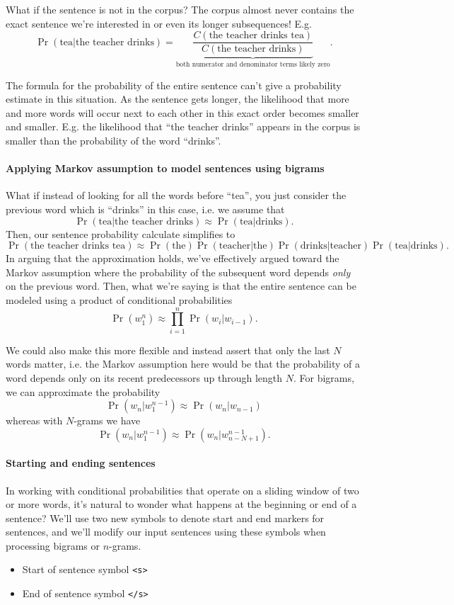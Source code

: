 \documentclass[12pt]{article}
\begin{document}
What if the sentence is not in the corpus? The corpus almost never contains the exact sentence we're interested in or even its longer subsequences! E.g.
\[
  \Pr(\textrm{tea} | \textrm{the teacher drinks}) = \underbrace{\frac{C(\textrm{the teacher drinks tea})}{C(\textrm{the teacher drinks})}}_{\textrm{both numerator and denominator terms likely zero}}.
\]

The formula for the probability of the entire sentence can't give a probability estimate in this situation. As the sentence gets longer, the likelihood that more and more words will occur next to each other in this exact order becomes smaller and smaller. E.g. the likelihood that ``the teacher drinks'' appears in the corpus is smaller than the probability of the word ``drinks''.

\paragraph{Applying Markov assumption to model sentences using bigrams} What if instead of looking for all the words before ``tea'', you just consider the previous word which is ``drinks'' in this case, i.e. we assume that
\[
  \Pr(\textrm{tea} | \textrm{the teacher drinks}) \approx \Pr(\textrm{tea} | \textrm{drinks}).
\]
Then, our sentence probability calculate simplifies to
\[
\Pr(\textrm{the teacher drinks tea} ) \approx \Pr(\textrm{the}) \Pr(\textrm{teacher} | \textrm{the}) \Pr(\textrm{drinks} | \textrm{teacher}) \Pr(\textrm{tea} | \textrm{drinks}).
\]
In arguing that the approximation holds, we've effectively argued toward the Markov assumption where the probability of the subsequent word depends \emph{only} on the previous word. Then, what we're saying is that the entire sentence can be modeled using a product of conditional probabilities
\[
  \Pr(w_1^n) \approx \prod_{i=1}^n \Pr(w_i | w_{i-1}).
\]

We could also make this more flexible and instead assert that only the last $N$ words matter, i.e. the Markov assumption here would be that the probability of a word depends only on its recent predecessors up through length $N$. For bigrams, we can approximate the probability
\[
  \Pr(w_n | w_1^{n-1}) \approx \Pr(w_n | w_{n-1})
\]
whereas with $N$-grams we have
\[
  \Pr(w_n | w_1^{n-1}) \approx \Pr(w_n | w_{n-N+1}^{n-1})  .
\]

\paragraph{Starting and ending sentences}
In working with conditional probabilities that operate on a sliding window of two or more words, it's natural to wonder what happens at the beginning or end of a sentence? We'll use two new symbols to denote start and end markers for sentences, and we'll modify our input sentences using these symbols when processing bigrams or $n$-grams.
\begin{itemize}
\item Start of sentence symbol \texttt{<s>}
\item End of sentence symbol \texttt{</s>}
\end{itemize}
\end{document}
